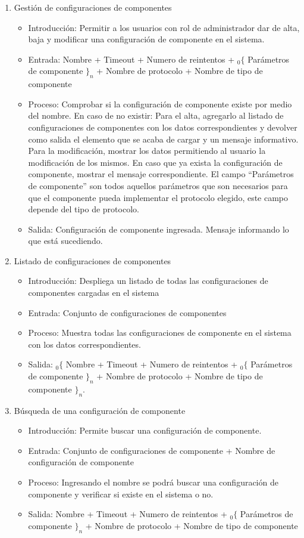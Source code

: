 \begin{enumerate}
			\item Gestión de configuraciones de componentes
				\begin{itemize}
					\item Introducción: Permitir a los usuarios con rol de administrador dar de alta, baja y modificar una configuración de componente en el sistema.
					\item Entrada: Nombre + Timeout + Numero de reintentos + ${}_{0}\{$ Parámetros de componente $\}_n$  + Nombre de protocolo + Nombre de tipo de componente
					\item Proceso: Comprobar si la configuración de componente existe por medio del nombre. En caso de no existir:
							Para el alta, agregarlo al listado de configuraciones de componentes con los datos correspondientes y devolver como salida el elemento que se acaba de cargar y un mensaje informativo.
							Para la modificación, mostrar los datos permitiendo al usuario la modificación de los mismos.
							En caso que ya exista la configuración de componente, mostrar el mensaje correspondiente.
							El campo ``Parámetros de componente'' son todos aquellos parámetros que son necesarios para que el componente pueda implementar el protocolo elegido, este campo depende del tipo de protocolo. 
					\item Salida: Configuración de componente ingresada. Mensaje informando lo que está sucediendo.
				\end{itemize}
			
			\item Listado de configuraciones de componentes
				\begin{itemize}
					\item Introducción: Despliega un listado de todas las configuraciones de componentes cargadas en el sistema
					\item Entrada: Conjunto de configuraciones de componentes
					\item Proceso: Muestra todas las configuraciones de componente en el sistema con los datos correspondientes.
					\item Salida: ${}_{0}\{$ Nombre + Timeout + Numero de reintentos + ${}_{0}\{$ Parámetros de componente $\}_n$  + Nombre de protocolo + Nombre de tipo de componente $\}_n$. 
				\end{itemize}
				
			\item Búsqueda de una configuración de componente
				\begin{itemize}
					\item Introducción: Permite buscar una configuración de componente.
					\item Entrada: Conjunto de configuraciones de componente + Nombre de configuración de componente
					\item Proceso: Ingresando el nombre se podrá buscar una configuración de componente y verificar si existe en el sistema o no.
					\item Salida: Nombre + Timeout + Numero de reintentos + ${}_{0}\{$ Parámetros de componente $\}_n$  + Nombre de protocolo + Nombre de tipo de componente
				\end{itemize}
			

\end{enumerate}
